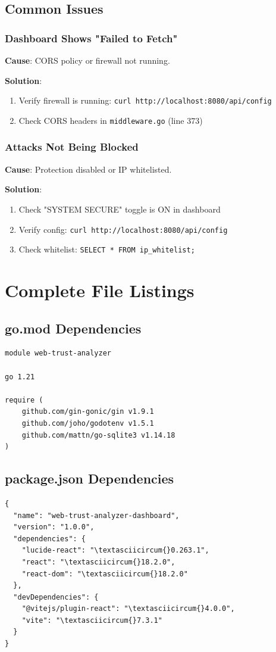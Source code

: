 \documentclass[11pt,a4paper]{report}
\begin{document}
\section{Common Issues}

\subsection{Dashboard Shows "Failed to Fetch"}
\textbf{Cause}: CORS policy or firewall not running.

\textbf{Solution}:
\begin{enumerate}
    \item Verify firewall is running: \texttt{curl http://localhost:8080/api/config}
    \item Check CORS headers in \texttt{middleware.go} (line 373)
\end{enumerate}

\subsection{Attacks Not Being Blocked}
\textbf{Cause}: Protection disabled or IP whitelisted.

\textbf{Solution}:
\begin{enumerate}
    \item Check "SYSTEM SECURE" toggle is ON in dashboard
    \item Verify config: \texttt{curl http://localhost:8080/api/config}
    \item Check whitelist: \texttt{SELECT * FROM ip\_whitelist;}
\end{enumerate}

\appendix

\chapter{Complete File Listings}

\section{go.mod Dependencies}
\begin{verbatim}
module web-trust-analyzer

go 1.21

require (
    github.com/gin-gonic/gin v1.9.1
    github.com/joho/godotenv v1.5.1
    github.com/mattn/go-sqlite3 v1.14.18
)
\end{verbatim}

\section{package.json Dependencies}
\begin{verbatim}
{
  "name": "web-trust-analyzer-dashboard",
  "version": "1.0.0",
  "dependencies": {
    "lucide-react": "\textasciicircum{}0.263.1",
    "react": "\textasciicircum{}18.2.0",
    "react-dom": "\textasciicircum{}18.2.0"
  },
  "devDependencies": {
    "@vitejs/plugin-react": "\textasciicircum{}4.0.0",
    "vite": "\textasciicircum{}7.3.1"
  }
}
\end{verbatim}
\end{document}
